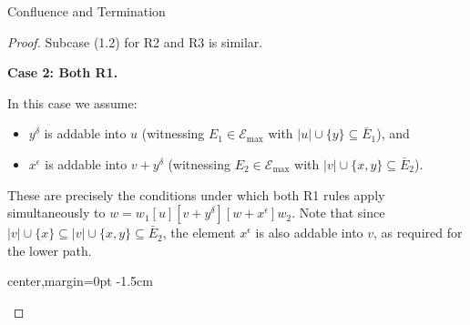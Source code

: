 \documentclass{article}
\theoremstyle{definition}
\theoremstyle{remark}
\theoremstyle{theorem}
\theoremstyle{definition}
\begin{document}
\begin{section}{Confluence and Termination}
\begin{proof}
Subcase (1.2) for R2 and R3 is similar.

\textbf{Case 2: Both R1.}

In this case we assume:
\begin{itemize}
  \item $y^\delta$ is addable into $u$ (witnessing $E_1 \in \mathcal{E}_{\max}$
        with $|u| \cup \{y\} \subseteq \bar{E}_1$), and
  \item $x^\epsilon$ is addable into $v+y^\delta$ (witnessing $E_2 \in
        \mathcal{E}_{\max}$ with $|v| \cup \{x,y\} \subseteq \bar{E}_2$).
\end{itemize}
These are precisely the conditions under which both R1 rules apply
simultaneously to $w = w_1[u][v+y^\delta][w+x^\epsilon]w_2$. Note that since
$|v|\cup\{x\} \subseteq |v|\cup\{x,y\} \subseteq \bar{E}_2$, the element $x^\epsilon$
is also addable into $v$, as required for the lower path.

\vspace{40pt}
\begin{center}
\begin{adjustbox}{center,margin=0pt -1.5cm}
\end{adjustbox}
\end{center}
\vspace{40pt}


\end{proof}
\end{section}
\end{document}
